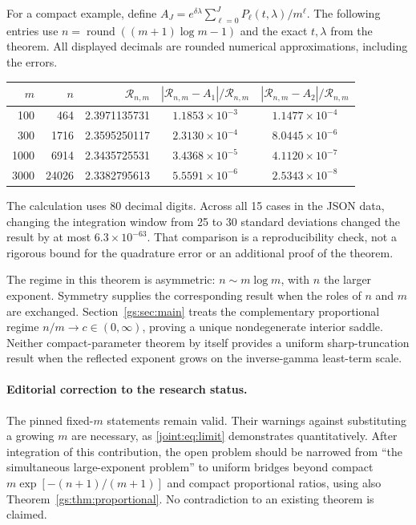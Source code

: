 \documentclass[11pt,a4paper]{article}
\numberwithin{equation}{section}
\theoremstyle{plain}
\theoremstyle{definition}
\theoremstyle{remark}
\begin{document}
For a compact example, define
$A_J=e^{\delta\lambda}\sum_{\ell=0}^JP_\ell(t,\lambda)/m^\ell$.
The following entries use
$n=\operatorname{round}((m+1)\log m-1)$ and the exact $t,\lambda$
from the theorem. All displayed decimals are rounded numerical
approximations, including the errors.
\begin{center}
\begin{tabular}{rrrcc}
\hline
$m$ & $n$ & $\mathcal R_{n,m}$ & $|\mathcal R_{n,m}-A_1|/\mathcal R_{n,m}$
   & $|\mathcal R_{n,m}-A_2|/\mathcal R_{n,m}$\\
\hline
100 & 464 & 2.3971135731 & $1.1853\times10^{-3}$ & $1.1477\times10^{-4}$\\
300 & 1716 & 2.3595250117 & $2.3130\times10^{-4}$ & $8.0445\times10^{-6}$\\
1000 & 6914 & 2.3435725531 & $3.4368\times10^{-5}$ & $4.1120\times10^{-7}$\\
3000 & 24026 & 2.3382795613 & $5.5591\times10^{-6}$ & $2.5343\times10^{-8}$\\
\hline
\end{tabular}
\end{center}
The calculation uses 80 decimal digits. Across all 15 cases in the
JSON data, changing the integration window from 25 to 30 standard
deviations changed the result by at most $6.3\times10^{-63}$.
That comparison is a reproducibility check, not a rigorous bound
for the quadrature error or an additional proof of the theorem.

The regime in this theorem is asymmetric: $n\sim m\log m$, with
$n$ the larger exponent. Symmetry supplies the corresponding result
when the roles of $n$ and $m$ are exchanged. Section~\ref{gs:sec:main} treats the complementary proportional regime
$n/m\to c\in(0,\infty)$, proving a unique nondegenerate interior saddle.
Neither compact-parameter theorem by itself provides a
uniform sharp-truncation result when the reflected exponent grows
on the inverse-gamma least-term scale.

\paragraph{Editorial correction to the research status.}
The pinned fixed-$m$ statements remain valid. Their warnings against
substituting a growing $m$ are necessary, as
\eqref{joint:eq:limit} demonstrates quantitatively. After integration
of this contribution, the open problem should be narrowed from
``the simultaneous large-exponent problem'' to uniform bridges beyond compact
$m\exp[-(n+1)/(m+1)]$ and compact proportional ratios,
using also Theorem~\ref{gs:thm:proportional}. No contradiction to an existing theorem is
claimed.
\end{document}
